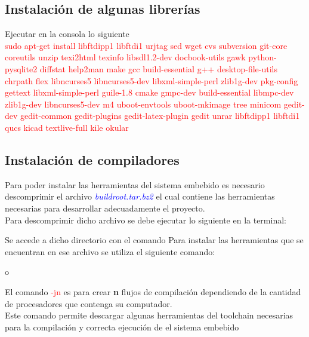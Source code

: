 \documentclass[12pt]{article}
\begin{document}
\subsection{Instalación de algunas librerías}
\noindent
Ejecutar en la consola lo siguiente\\
\textcolor{red}{sudo apt-get install libftdipp1 libftdi1 urjtag sed wget cvs subversion git-core coreutils unzip texi2html texinfo libsdl1.2-dev docbook-utils gawk python-pysqlite2 diffstat help2man make gcc build-essential g++ desktop-file-utils chrpath flex libncurses5 libncurses5-dev libxml-simple-perl zlib1g-dev pkg-config gettext libxml-simple-perl guile-1.8 cmake gmpc-dev build-essential libmpc-dev zlib1g-dev libncurses5-dev m4 uboot-envtools uboot-mkimage tree minicom gedit-dev gedit-common gedit-plugins gedit-latex-plugin gedit unrar libftdipp1 libftdi1 qucs kicad textlive-full kile okular}

\subsection{Instalación de compiladores}
\noindent
Para poder instalar las herramientas del sistema embebido es necesario descomprimir el archivo \textit{\textcolor{blue}{buildroot.tar.bz2}} el cual contiene las herramientas necesarias para desarrollar adecuadamente el proyecto.\\
Para descomprimir dicho archivo se debe ejecutar lo siguiente en la terminal:
\begin{center}
\end{center}
\noindent
Se accede a dicho directorio con el comando 
Para instalar las herramientas que se encuentran en ese archivo se utiliza el siguiente comando:
\begin{center}
  o 
\end{center}
\noindent
El comando \textcolor{red}{-jn} es para crear \textbf{n} flujos de compilación dependiendo de la cantidad de procesadores que contenga su computador.\\
Este comando permite descargar algunas herramientas del toolchain necesarias para la compilación y correcta ejecución de el sistema embebido
\end{document}
